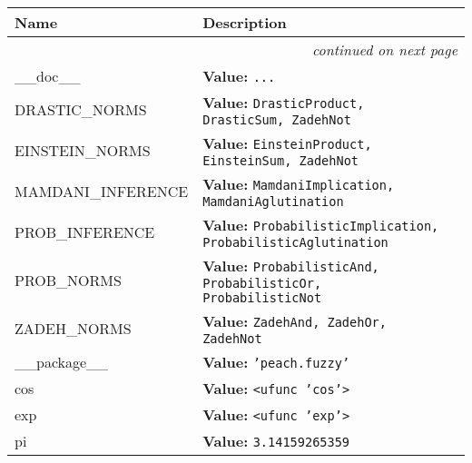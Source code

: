     \vspace{-1cm}
\hspace{\varindent}\begin{longtable}{|p{\varnamewidth}|p{\vardescrwidth}|l}
\cline{1-2}
\cline{1-2} \centering \textbf{Name} & \centering \textbf{Description}& \\
\cline{1-2}
\endhead\cline{1-2}\multicolumn{3}{r}{\small\textit{continued on next page}}\\\endfoot\cline{1-2}
\endlastfoot\raggedright \_\-\_\-d\-o\-c\-\_\-\_\- & \raggedright \textbf{Value:} 
{\tt \texttt{...}}&\\
\cline{1-2}
\raggedright D\-R\-A\-S\-T\-I\-C\-\_\-N\-O\-R\-M\-S\- & \raggedright \textbf{Value:} 
{\tt DrasticProduct, DrasticSum, ZadehNot}&\\
\cline{1-2}
\raggedright E\-I\-N\-S\-T\-E\-I\-N\-\_\-N\-O\-R\-M\-S\- & \raggedright \textbf{Value:} 
{\tt EinsteinProduct, EinsteinSum, ZadehNot}&\\
\cline{1-2}
\raggedright M\-A\-M\-D\-A\-N\-I\-\_\-I\-N\-F\-E\-R\-E\-N\-C\-E\- & \raggedright \textbf{Value:} 
{\tt MamdaniImplication, MamdaniAglutination}&\\
\cline{1-2}
\raggedright P\-R\-O\-B\-\_\-I\-N\-F\-E\-R\-E\-N\-C\-E\- & \raggedright \textbf{Value:} 
{\tt ProbabilisticImplication, ProbabilisticAglutination}&\\
\cline{1-2}
\raggedright P\-R\-O\-B\-\_\-N\-O\-R\-M\-S\- & \raggedright \textbf{Value:} 
{\tt ProbabilisticAnd, ProbabilisticOr, ProbabilisticNot}&\\
\cline{1-2}
\raggedright Z\-A\-D\-E\-H\-\_\-N\-O\-R\-M\-S\- & \raggedright \textbf{Value:} 
{\tt ZadehAnd, ZadehOr, ZadehNot}&\\
\cline{1-2}
\raggedright \_\-\_\-p\-a\-c\-k\-a\-g\-e\-\_\-\_\- & \raggedright \textbf{Value:} 
{\tt \texttt{'}\texttt{peach.fuzzy}\texttt{'}}&\\
\cline{1-2}
\raggedright c\-o\-s\- & \raggedright \textbf{Value:} 
{\tt {\textless}ufunc 'cos'{\textgreater}}&\\
\cline{1-2}
\raggedright e\-x\-p\- & \raggedright \textbf{Value:} 
{\tt {\textless}ufunc 'exp'{\textgreater}}&\\
\cline{1-2}
\raggedright p\-i\- & \raggedright \textbf{Value:} 
{\tt 3.14159265359}&\\
\cline{1-2}
\end{longtable}

